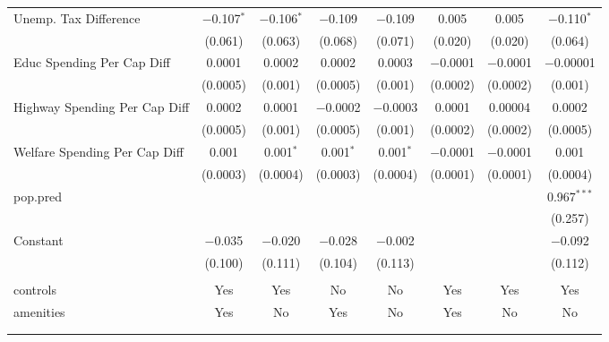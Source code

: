 \begin{table}[!htbp]
\begin{tabular}{@{\extracolsep{5pt}}lccccccc}
  Unemp. Tax Difference & $-$0.107$^{*}$ & $-$0.106$^{*}$ & $-$0.109 & $-$0.109 & 0.005 & 0.005 & $-$0.110$^{*}$ \\ 
  & (0.061) & (0.063) & (0.068) & (0.071) & (0.020) & (0.020) & (0.064) \\ 
  Educ Spending Per Cap Diff & 0.0001 & 0.0002 & 0.0002 & 0.0003 & $-$0.0001 & $-$0.0001 & $-$0.00001 \\ 
  & (0.0005) & (0.001) & (0.0005) & (0.001) & (0.0002) & (0.0002) & (0.001) \\ 
  Highway Spending Per Cap Diff & 0.0002 & 0.0001 & $-$0.0002 & $-$0.0003 & 0.0001 & 0.00004 & 0.0002 \\ 
  & (0.0005) & (0.001) & (0.0005) & (0.001) & (0.0002) & (0.0002) & (0.0005) \\ 
  Welfare Spending Per Cap Diff & 0.001 & 0.001$^{*}$ & 0.001$^{*}$ & 0.001$^{*}$ & $-$0.0001 & $-$0.0001 & 0.001 \\ 
  & (0.0003) & (0.0004) & (0.0003) & (0.0004) & (0.0001) & (0.0001) & (0.0004) \\ 
  pop.pred &  &  &  &  &  &  & 0.967$^{***}$ \\ 
  &  &  &  &  &  &  & (0.257) \\ 
  Constant & $-$0.035 & $-$0.020 & $-$0.028 & $-$0.002 &  &  & $-$0.092 \\ 
  & (0.100) & (0.111) & (0.104) & (0.113) &  &  & (0.112) \\ 
 \hline \\[-1.8ex] 
controls & Yes & Yes & No & No & Yes & Yes & Yes \\ 
amenities & Yes & No & Yes & No & Yes & No & No \\ 
\hline \\[-1.8ex] 
\hline 
\hline \\[-1.8ex] 
\end{tabular} 
\end{table} 
